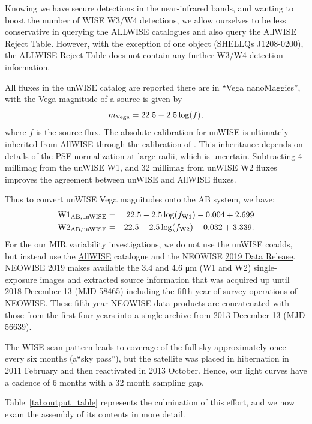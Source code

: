 \documentclass[usenatbib]{mnras}
\begin{document}
Knowing we have secure detections in the near-infrared bands, and wanting to boost the number of WISE W3/W4 detections, we allow ourselves to be less conservative in querying the ALLWISE catalogues and also query the AllWISE Reject Table. However, with the exception of one object (SHELLQs  J1208-0200), the ALLWISE Reject Table does not contain any further W3/W4 detection information. 

All fluxes in the unWISE catalog are reported there are in ``Vega
nanoMaggies'', with the Vega magnitude of a source is given by
\begin{equation}
m_{\rm Vega} = 22.5 - 2.5\log(f),
\end{equation} 
where $f$ is the source flux. The absolute calibration for unWISE is
ultimately inherited from AllWISE through the calibration of
\citet{Meisner2017a}. This inheritance depends on details of the PSF
normalization at large radii, which is uncertain. Subtracting 4
millimag from the unWISE W1, and 32 millimag from unWISE W2 fluxes
improves the agreement between unWISE and AllWISE fluxes.

Thus to convert unWISE Vega magnitudes onto the AB system, we have:     
\begin{eqnarray*}
        {\rm W1}_{\rm AB, unWISE}  & = &   22.5 - 2.5 \log(f_{\rm W1}) - 0.004 + 2.699 \\
        {\rm W2}_{\rm AB, unWISE}  &  = &  22.5 - 2.5 \log(f_{\rm W2}) - 0.032 + 3.339. 
\end{eqnarray*}
For the our MIR variability investigations, we do not use the unWISE
coadds, but instead use the
\href{http://wise2.ipac.caltech.edu/docs/release/allwise/}{AllWISE}
catalogue and the NEOWISE
\href{http://wise2.ipac.caltech.edu/docs/release/neowise/}{2019 Data
Release}. NEOWISE 2019 makes available the 3.4 and 4.6 μm (W1 and W2)
single-exposure images and extracted source information that was
acquired up until 2018 December 13 (MJD 58465) including the fifth
year of survey operations of NEOWISE. These fifth year NEOWISE data
products are concatenated with those from the first four years into a
single archive from 2013 December 13 (MJD 56639).

The WISE scan pattern leads to coverage of the full-sky approximately
once every six months (a``sky pass''), but the satellite was placed in
hibernation in 2011 February and then reactivated in 2013
October. Hence, our light curves have a cadence of 6 months with a 32
month sampling gap.

Table~\ref{tab:output_table} represents the culmination of this
effort, and we now exam the assembly of its contents in more detail.
\begin{landscape}
      
\end{landscape}
\end{document}
